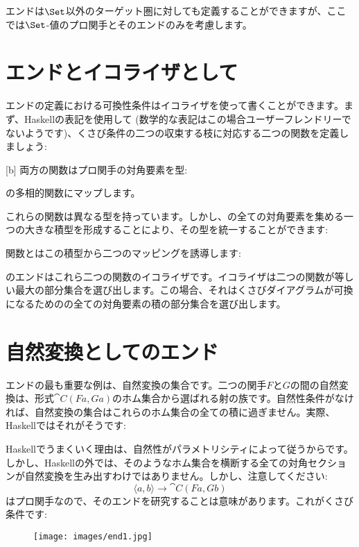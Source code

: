 エンドは$\Set$以外のターゲット圏に対しても定義することができますが、ここでは$\Set$-値のプロ関手とそのエンドのみを考慮します。

\section{エンドとイコライザとして}

エンドの定義における可換性条件はイコライザを使って書くことができます。まず、Haskellの表記を使用して (数学的な表記はこの場合ユーザーフレンドリーでないようです)、くさび条件の二つの収束する枝に対応する二つの関数を定義しましょう: 

[b]
両方の関数はプロ関手の対角要素を型: 

の多相的関数にマップします。

これらの関数は異なる型を持っています。しかし、の全ての対角要素を集める一つの大きな積型を形成することにより、その型を統一することができます: 

関数とはこの積型から二つのマッピングを誘導します: 

のエンドはこれら二つの関数のイコライザです。イコライザは二つの関数が等しい最大の部分集合を選び出します。この場合、それはくさびダイアグラムが可換になるためのの全ての対角要素の積の部分集合を選び出します。

\section{自然変換としてのエンド}

エンドの最も重要な例は、自然変換の集合です。二つの関手$F$と$G$の間の自然変換は、形式$\cat{C}(F a, G a)$のホム集合から選ばれる射の族です。自然性条件がなければ、自然変換の集合はこれらのホム集合の全ての積に過ぎません。実際、Haskellではそれがそうです: 

Haskellでうまくいく理由は、自然性がパラメトリシティによって従うからです。しかし、Haskellの外では、そのようなホム集合を横断する全ての対角セクションが自然変換を生み出すわけではありません。しかし、注意してください: 
\[\langle a, b \rangle \to \cat{C}(F a, G b)\]
はプロ関手なので、そのエンドを研究することは意味があります。これがくさび条件です: 

\begin{figure}[H]
  \centering
  \texttt{[image: images/end1.jpg]}
\end{figure}

